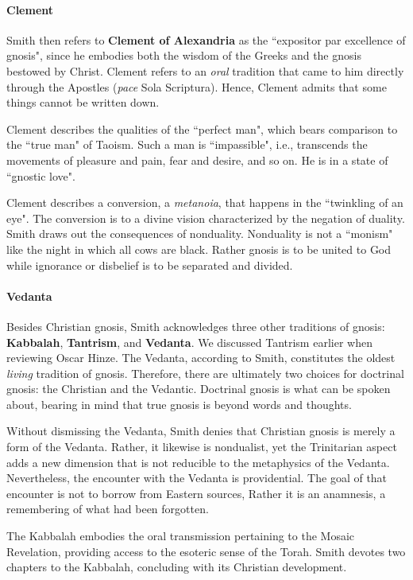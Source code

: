 \paragraph{Clement}
Smith then refers to \textbf{Clement of Alexandria} as the ``expositor par excellence of gnosis", since he embodies both the wisdom of the Greeks and the gnosis bestowed by Christ. Clement refers to an \emph{oral} tradition that came to him directly through the Apostles (\emph{pace} Sola Scriptura). Hence, Clement admits that some things cannot be written down.

Clement describes the qualities of the ``perfect man", which bears comparison to the ``true man" of Taoism. Such a man is ``impassible", i.e., transcends the movements of pleasure and pain, fear and desire, and so on. He is in a state of ``gnostic love".

Clement describes a conversion, a \emph{metanoia}, that happens in the ``twinkling of an eye". The conversion is to a divine vision characterized by the negation of duality. Smith draws out the consequences of nonduality. Nonduality is not a ``monism" like the night in which all cows are black. Rather gnosis is to be united to God while ignorance or disbelief is to be separated and divided.

\paragraph{Vedanta}
Besides Christian gnosis, Smith acknowledges three other traditions of gnosis: \textbf{Kabbalah}, \textbf{Tantrism}, and \textbf{Vedanta}. We discussed Tantrism earlier when reviewing Oscar Hinze. The Vedanta, according to Smith, constitutes the oldest \emph{living} tradition of gnosis. Therefore, there are ultimately two choices for doctrinal gnosis: the Christian and the Vedantic. Doctrinal gnosis is what can be spoken about, bearing in mind that true gnosis is beyond words and thoughts.

Without dismissing the Vedanta, Smith denies that Christian gnosis is merely a form of the Vedanta. Rather, it likewise is nondualist, yet the Trinitarian aspect adds a new dimension that is not reducible to the metaphysics of the Vedanta. Nevertheless, the encounter with the Vedanta is providential. The goal of that encounter is not to borrow from Eastern sources, Rather it is an anamnesis, a remembering of what had been forgotten.

The Kabbalah embodies the oral transmission pertaining to the Mosaic Revelation, providing access to the esoteric sense of the Torah. Smith devotes two chapters to the Kabbalah, concluding with its Christian development.


